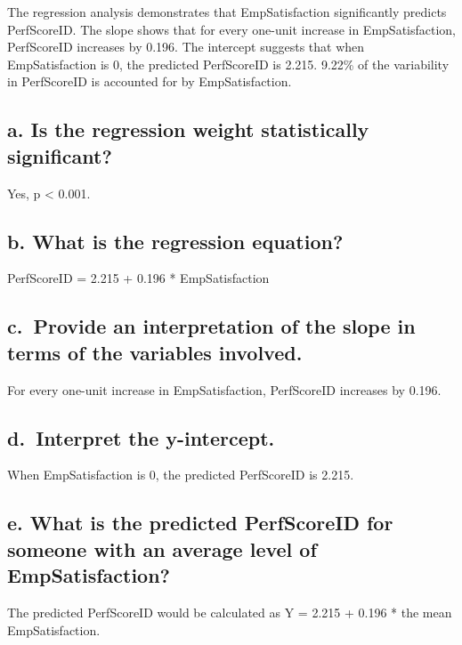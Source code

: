 \documentclass[
]{article}
\begin{document}
The regression analysis demonstrates that EmpSatisfaction significantly
predicts PerfScoreID. The slope shows that for every one-unit increase
in EmpSatisfaction, PerfScoreID increases by 0.196. The intercept
suggests that when EmpSatisfaction is 0, the predicted PerfScoreID is
2.215. 9.22\% of the variability in PerfScoreID is accounted for by
EmpSatisfaction.

\subsection{a. Is the regression weight statistically
significant?}\label{a.-is-the-regression-weight-statistically-significant}

Yes, p \textless{} 0.001.

\subsection{b. What is the regression
equation?}\label{b.-what-is-the-regression-equation}

PerfScoreID = 2.215 + 0.196 * EmpSatisfaction

\subsection{c.~Provide an interpretation of the slope in terms of the
variables
involved.}\label{c.-provide-an-interpretation-of-the-slope-in-terms-of-the-variables-involved.}

For every one-unit increase in EmpSatisfaction, PerfScoreID increases by
0.196.

\subsection{d.~Interpret the
y-intercept.}\label{d.-interpret-the-y-intercept.}

When EmpSatisfaction is 0, the predicted PerfScoreID is 2.215.

\subsection{e. What is the predicted PerfScoreID for someone with an
average level of
EmpSatisfaction?}\label{e.-what-is-the-predicted-perfscoreid-for-someone-with-an-average-level-of-empsatisfaction}

The predicted PerfScoreID would be calculated as Y = 2.215 + 0.196 * the
mean EmpSatisfaction.
\end{document}

